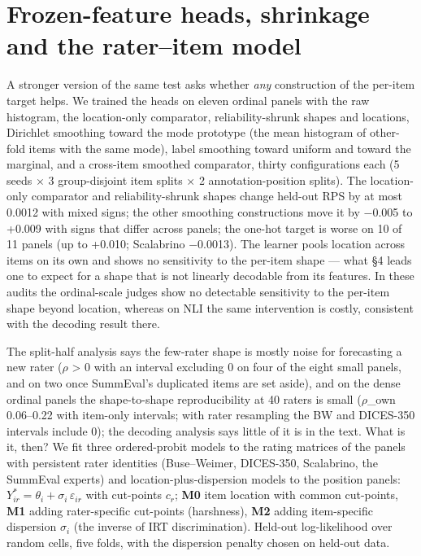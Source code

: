 \documentclass{article}
\begin{document}
\section{Frozen-feature heads, shrinkage and the rater--item model}


A stronger version of the same test asks whether \emph{any} construction of the per-item target helps. We trained the heads on eleven ordinal panels with the raw histogram, the location-only comparator, reliability-shrunk shapes and locations, Dirichlet smoothing toward the mode prototype (the mean histogram of other-fold items with the same mode), label smoothing toward uniform and toward the marginal, and a cross-item smoothed comparator, thirty configurations each (5 seeds $\times$ 3 group-disjoint item splits $\times$ 2 annotation-position splits). The location-only comparator and reliability-shrunk shapes change held-out RPS by at most 0.0012 with mixed signs; the other smoothing constructions move it by $-$0.005 to +0.009 with signs that differ across panels; the one-hot target is worse on 10 of 11 panels (up to +0.010; Scalabrino $-$0.0013). The learner pools location across items on its own and shows no sensitivity to the per-item shape --- what \S{}4 leads one to expect for a shape that is not linearly decodable from its features. In these audits the ordinal-scale judges show no detectable sensitivity to the per-item shape beyond location, whereas on NLI the same intervention is costly, consistent with the decoding result there.

The split-half analysis says the few-rater shape is mostly noise for forecasting a new rater ($\rho$ \textgreater{} 0 with an interval excluding 0 on four of the eight small panels, and on two once SummEval's duplicated items are set aside), and on the dense ordinal panels the shape-to-shape reproducibility at 40 raters is small ($\rho$\_own 0.06--0.22 with item-only intervals; with rater resampling the BW and DICES-350 intervals include 0); the decoding analysis says little of it is in the text. What is it, then? We fit three ordered-probit models to the rating matrices of the panels with persistent rater identities (Buse--Weimer, DICES-350, Scalabrino, the SummEval experts) and location-plus-dispersion models to the position panels: \(Y^*_{ir} = \theta_i + \sigma_i\,\varepsilon_{ir}\) with cut-points \(c_{r}\); \textbf{M0} item location with common cut-points, \textbf{M1} adding rater-specific cut-points (harshness), \textbf{M2} adding item-specific dispersion \(\sigma_i\) (the inverse of IRT discrimination). Held-out log-likelihood over random cells, five folds, with the dispersion penalty chosen on held-out data.
\end{document}
